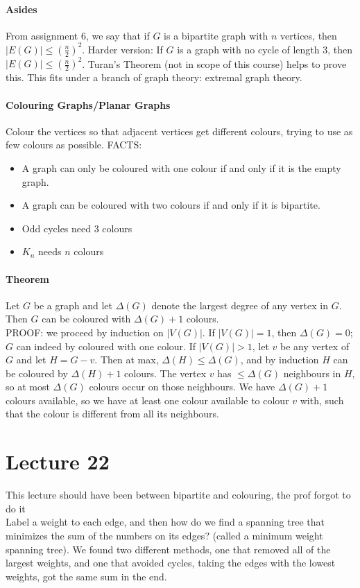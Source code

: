 \documentclass[10pt,letter]{article}
\begin{document}
\paragraph{Asides}
From assignment 6, we say that if $G$ is a bipartite graph with $n$ vertices, then $|E(G)|\leq\left(\frac{n}{2}\right)^2$. Harder version: If $G$ is a graph with no cycle of length 3, then $|E(G)|\leq \left(\frac{n}{2}\right)^2$. Turan's Theorem (not in scope of this course) helps to prove this. This fits under a branch of graph theory: extremal graph theory. 

\paragraph{Colouring Graphs/Planar Graphs}
Colour the vertices so that adjacent vertices get different colours, trying to use as few colours as possible. FACTS: \begin{itemize}
    \item A graph can only be coloured with one colour if and only if it is the empty graph.
    \item A graph can be coloured with two colours if and only if it is bipartite. 
    \item Odd cycles need 3 colours
    \item $K_n$ needs $n$ colours 
\end{itemize} 

\paragraph{Theorem}
Let $G$ be a graph and let $\Delta(G)$ denote the largest degree of any vertex in $G$. Then $G$ can be coloured with $\Delta(G)+1$ colours. \\ 
PROOF: we proceed by induction on $|V(G)|$. If $|V(G)|=1$, then $\Delta(G)=0$; $G$ can indeed by coloured with one colour. If $|V(G)|>1$, let $v$ be any vertex of $G$ and let $H=G-v$. Then at max, $\Delta(H)\leq\Delta(G)$, and by induction $H$ can be coloured by $\Delta(H)+1$ colours. The vertex $v$ has $\leq\Delta(G)$ neighbours in $H$, so at most $\Delta(G)$ colours occur on those neighbours. We have $\Delta(G)+1$ colours available, so we have at least one colour available to colour $v$ with, such that the colour is different from all its neighbours. 

\section*{Lecture 22}
This lecture should have been between bipartite and colouring, the prof forgot to do it\\ 
Label a weight to each edge, and then how do we find a spanning tree that minimizes the sum of the numbers on its edges? (called a minimum weight spanning tree). We found two different methods, one that removed all of the largest weights, and one that avoided cycles, taking the edges with the lowest weights, got the same sum in the end. 
\end{document}
